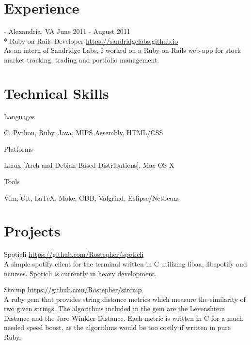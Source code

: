 \documentclass[letterpaper,margin,line,11pt]{resume}
\newcommand{\rurl}[1]{\hfill {\footnotesize \url{#1}}}
\newcommand{\rdate}[1]{\hfill {\small #1}}
\newcommand{\tab}[1]{\hspace{1em}}
\renewcommand{\employer}[5]{\item[#1] - #2 \rdate{#3} \\* #4 \rurl{#5}}
\begin{document}
\begin{resume}
\section{\mysidestyle Experience}
	\begin{asparadesc}
		\employer{Sandridge Labs}{Alexandria, VA}{June 2011 - August 2011}{Ruby-on-Rails Developer}{https://sandridgelabs.github.io}
        \vspace{1em}\\
		As an intern of Sandridge Labs, I worked on a Ruby-on-Rails web-app for stock market tracking, trading and portfolio management.
		\normalsize
	\end{asparadesc}

\section{\mysidestyle Technical Skills}
	\begin{compactdesc}
		\item[Languages]
			\item\tab{} C, Python, Ruby, Java, MIPS Assembly, HTML/CSS
			\vspace{1em}
		\item[Platforms]
			\item\tab{} Linux [Arch and Debian-Based Distributions], Mac OS X
			\vspace{1em}
		\item[Tools]
			\item\tab{} Vim, Git, \LaTeX, Make, GDB, Valgrind, Eclipse/Netbeans
	\end{compactdesc}

\section{\mysidestyle Projects}
	\begin{compactdesc}
		\item[Spoticli] \rurl{https://github.com/Rostepher/spoticli}
		\\
		A simple spotify client for the terminal written in C utilizing libaa, libspotify and ncurses. Spoticli is currently in heavy development.
		
		\vspace{1em}
		
		\item[Strcmp] \rurl{https://github.com/Rostepher/strcmp}
		\\
		A ruby gem that provides string distance metrics which measure the similarity of two given strings. The algorithms included in the gem are the Levenshtein Distance and the Jaro-Winkler Distance. Each metric is written in C for a much needed speed boost, as the algorithms would be too costly if written in pure Ruby.
	\end{compactdesc}


\end{resume}
\end{document}
